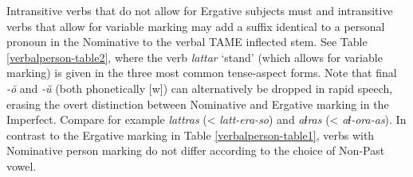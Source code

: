 Intransitive verbs that do not allow for Ergative subjects must and intransitive verbs that allow for variable marking may add a suffix identical to a personal pronoun in the Nominative to the verbal TAME inflected stem. See Table \ref{verbalperson-table2}, where the verb \textit{lattar} `stand' (which allows for variable marking) is given in the three most common tense-aspect forms. Note that final \textit{-\u{o}} and \textit{-\u{u}} (both phonetically [w]) can alternatively be dropped in rapid speech, erasing the overt distinction between Nominative and Ergative marking in the Imperfect. Compare for example \textit{lattras} (< \textit{latt-era-so}) and \textit{aɬras} (< \textit{aɬ-ora-as}). In contrast to the Ergative marking in Table \ref{verbalperson-table1}, verbs with Nominative person marking do not differ according to the choice of Non-Past vowel.

